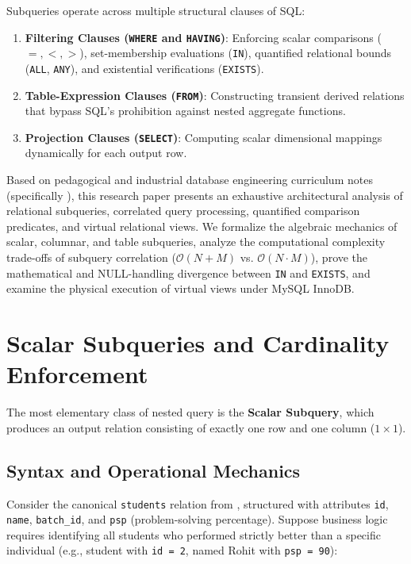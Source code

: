 \documentclass[10pt,twocolumn,letterpaper]{article}
\begin{document}
Subqueries operate across multiple structural clauses of SQL:
\begin{enumerate}
    \item \textbf{Filtering Clauses (\texttt{WHERE} and \texttt{HAVING})}: Enforcing scalar comparisons ($=, <, >$), set-membership evaluations (\texttt{IN}), quantified relational bounds (\texttt{ALL}, \texttt{ANY}), and existential verifications (\texttt{EXISTS}).
    \item \textbf{Table-Expression Clauses (\texttt{FROM})}: Constructing transient derived relations that bypass SQL's prohibition against nested aggregate functions.
    \item \textbf{Projection Clauses (\texttt{SELECT})}: Computing scalar dimensional mappings dynamically for each output row.
\end{enumerate}

Based on pedagogical and industrial database engineering curriculum notes (specifically \cite{sql6notes}), this research paper presents an exhaustive architectural analysis of relational subqueries, correlated query processing, quantified comparison predicates, and virtual relational views. We formalize the algebraic mechanics of scalar, columnar, and table subqueries, analyze the computational complexity trade-offs of subquery correlation ($\mathcal{O}(N + M)$ vs. $\mathcal{O}(N \cdot M)$), prove the mathematical and NULL-handling divergence between \texttt{IN} and \texttt{EXISTS}, and examine the physical execution of virtual views under MySQL InnoDB.

\section{Scalar Subqueries and Cardinality Enforcement}
\label{sec:scalar_subqueries}

The most elementary class of nested query is the \textbf{Scalar Subquery}, which produces an output relation consisting of exactly one row and one column ($1 \times 1$).

\subsection{Syntax and Operational Mechanics}
Consider the canonical \texttt{students} relation from \cite{sql6notes}, structured with attributes \texttt{id}, \texttt{name}, \texttt{batch\_id}, and \texttt{psp} (problem-solving percentage). Suppose business logic requires identifying all students who performed strictly better than a specific individual (e.g., student with \texttt{id = 2}, named Rohit with \texttt{psp = 90}):
\end{document}
